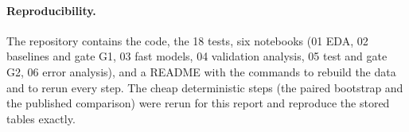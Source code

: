 \documentclass[11pt,a4paper]{article}
\begin{document}
\paragraph{Reproducibility.} The repository contains the code, the 18 tests, six notebooks (01 EDA, 02 baselines and gate G1, 03 fast models, 04 validation analysis, 05 test and gate G2, 06 error analysis), and a README with the commands to rebuild the data and to rerun every step. The cheap deterministic steps (the paired bootstrap and
the published comparison) were rerun for this report and reproduce the stored tables exactly.

\end{document}
